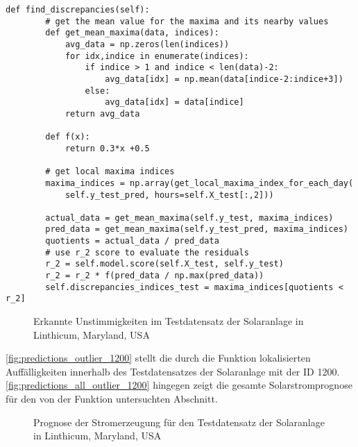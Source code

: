 \documentclass[12pt, a4paper]{article}
\begin{document}
\newpage

\begin{lstlisting}[basicstyle=\small,label={lst:discrepancies_detection}, caption={Funktion zur Erkennung von Ausreißern}]
def find_discrepancies(self):
        # get the mean value for the maxima and its nearby values
        def get_mean_maxima(data, indices):
            avg_data = np.zeros(len(indices))
            for idx,indice in enumerate(indices):
                if indice > 1 and indice < len(data)-2:
                    avg_data[idx] = np.mean(data[indice-2:indice+3])
                else:
                    avg_data[idx] = data[indice]
            return avg_data
        
        def f(x):
            return 0.3*x +0.5
        
        # get local maxima indices
        maxima_indices = np.array(get_local_maxima_index_for_each_day(
            self.y_test_pred, hours=self.X_test[:,2]))
        
        actual_data = get_mean_maxima(self.y_test, maxima_indices)
        pred_data = get_mean_maxima(self.y_test_pred, maxima_indices)
        quotients = actual_data / pred_data
        # use r_2 score to evaluate the residuals
        r_2 = self.model.score(self.X_test, self.y_test)
        r_2 = r_2 * f(pred_data / np.max(pred_data))
        self.discrepancies_indices_test = maxima_indices[quotients < r_2]        
\end{lstlisting}

\begin{figure}[H]
\centering
\def\svgwidth{400pt}

\caption{Erkannte Unstimmigkeiten im Testdatensatz der Solaranlage in Linthicum, Maryland, USA}
\label{fig:predictions_outlier_1200}
\end{figure}

\autoref{fig:predictions_outlier_1200} stellt die durch die Funktion lokalisierten Auffälligkeiten innerhalb des Testdatensatzes der Solaranlage mit der ID 1200. \autoref{fig:predictions_all_outlier_1200} hingegen zeigt die gesamte Solarstromprognose für den von der Funktion untersuchten Abschnitt. 

\begin{figure}[H]
\centering
\def\svgwidth{400pt}

\caption{Prognose der Stromerzeugung für den Testdatensatz der Solaranlage in Linthicum, Maryland, USA}
\label{fig:predictions_all_outlier_1200}
\end{figure}
\end{document}
